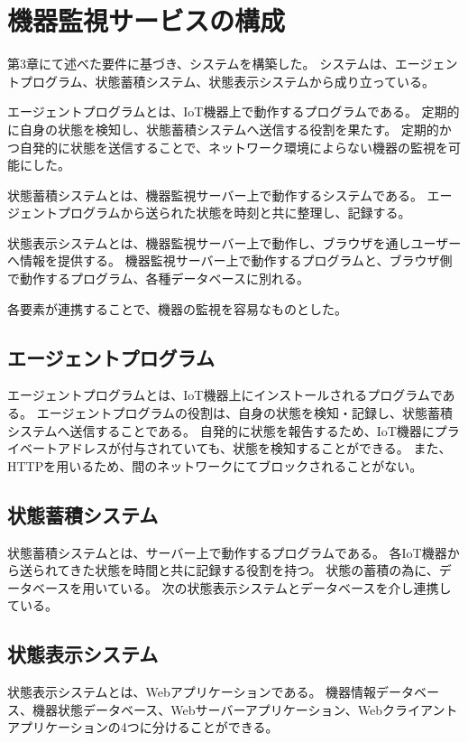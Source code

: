 \section{機器監視サービスの構成}
第3章にて述べた要件に基づき、システムを構築した。
システムは、エージェントプログラム、状態蓄積システム、状態表示システムから成り立っている。

エージェントプログラムとは、IoT機器上で動作するプログラムである。
定期的に自身の状態を検知し、状態蓄積システムへ送信する役割を果たす。
定期的かつ自発的に状態を送信することで、ネットワーク環境によらない機器の監視を可能にした。

状態蓄積システムとは、機器監視サーバー上で動作するシステムである。
エージェントプログラムから送られた状態を時刻と共に整理し、記録する。

状態表示システムとは、機器監視サーバー上で動作し、ブラウザを通しユーザーへ情報を提供する。
機器監視サーバー上で動作するプログラムと、ブラウザ側で動作するプログラム、各種データベースに別れる。

各要素が連携することで、機器の監視を容易なものとした。

\subsection{エージェントプログラム}
エージェントプログラムとは、IoT機器上にインストールされるプログラムである。
エージェントプログラムの役割は、自身の状態を検知・記録し、状態蓄積システムへ送信することである。
自発的に状態を報告するため、IoT機器にプライベートアドレスが付与されていても、状態を検知することができる。
また、HTTPを用いるため、間のネットワークにてブロックされることがない。

\subsection{状態蓄積システム}
状態蓄積システムとは、サーバー上で動作するプログラムである。
各IoT機器から送られてきた状態を時間と共に記録する役割を持つ。
状態の蓄積の為に、データベースを用いている。
次の状態表示システムとデータベースを介し連携している。

\subsection{状態表示システム}
状態表示システムとは、Webアプリケーションである。
機器情報データベース、機器状態データベース、Webサーバーアプリケーション、Webクライアントアプリケーションの4つに分けることができる。


